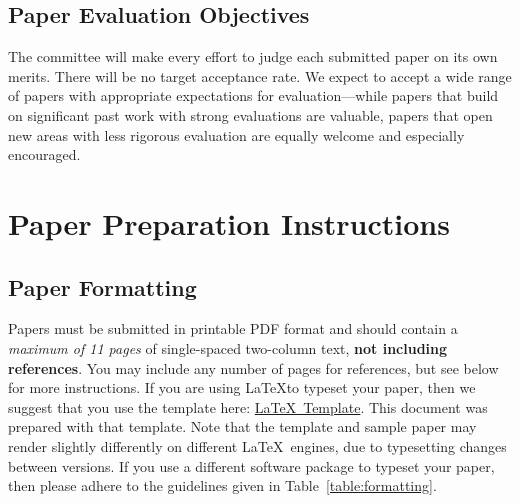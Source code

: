 \documentclass{common/sig-alternate}
\begin{document}
\subsection{Paper Evaluation Objectives} 
The committee will make every effort to judge each submitted paper on its own merits. There will be no target acceptance rate. We expect to accept a wide range of papers with appropriate expectations for evaluation---while papers that build on significant past work with strong evaluations are valuable, papers that open new areas with less rigorous evaluation are equally welcome and especially encouraged.

\section{Paper Preparation Instructions}

\subsection{Paper Formatting}

Papers must be submitted in printable PDF format and should contain a {\em maximum of 11 pages} of single-spaced two-column text, {\bf not including references}.  You may include any number of pages for references, but see below for more instructions.  If you are using \LaTeX to typeset your paper, then we suggest that you use the template here: \href{https://www.microarch.org/micro56/submit/micro56-latex-template.zip}{\LaTeX~Template}. This document was prepared with that template. Note that the template and sample paper may render slightly differently on different \LaTeX~engines, due to typesetting changes between versions. If you use a different software package to typeset your paper, then please adhere to the guidelines given in Table~\ref{table:formatting}. 
\end{document}
